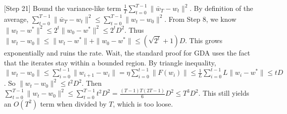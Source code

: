 \documentclass{article}
\begin{document}
[Step 21] Bound the variance-like term $\frac{1}{T} \sum_{t=0}^{T-1} \|\bar{w}_T - w_t\|^2$. By definition of the average, $\sum_{t=0}^{T-1} \|\bar{w}_T - w_t\|^2 \leq \sum_{t=0}^{T-1} \|w_t - w_0\|^2$. From Step 8, we know $\|w_t - w^*\|^2 \leq 2^t \|w_0 - w^*\|^2 \leq 2^t D^2$. Thus $\|w_t - w_0\| \leq \|w_t - w^*\| + \|w_0 - w^*\| \leq (\sqrt{2^t} + 1)D$. This grows exponentially and ruins the rate.
Wait, the standard proof for GDA uses the fact that the iterates stay within a bounded region. By triangle inequality, $\|w_t - w_0\| \leq \sum_{i=0}^{t-1} \|w_{i+1} - w_i\| = \eta \sum_{i=0}^{t-1} \|F(w_i)\| \leq \frac{1}{L} \sum_{i=0}^{t-1} L \|w_i - w^*\| \leq t D$.
So $\|w_t - w_0\|^2 \leq t^2 D^2$. Then $\sum_{t=0}^{T-1} \|w_t - w_0\|^2 \leq \sum_{t=0}^{T-1} t^2 D^2 = \frac{(T-1)T(2T-1)}{6} D^2 \leq T^3 D^2$.
This still yields an $O(T^2)$ term when divided by $T$, which is too loose.
\end{document}
